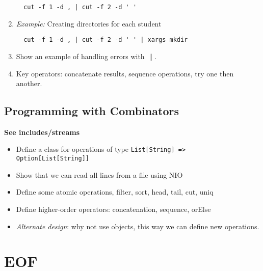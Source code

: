 \documentclass[9pt]{extbook}
\begin{document}
\begin{enumerate}
  \begin{lstlisting}
  cut -f 1 -d , | cut -f 2 -d ' '
  \end{lstlisting}

  
  \item \emph{Example:} Creating directories for each student

  \begin{lstlisting}
  cut -f 1 -d , | cut -f 2 -d ' ' | xargs mkdir
  \end{lstlisting}

  \item Show an example of handling errors with $\|$.

  \item Key operators: concatenate results, sequence operations, try one then
  another.

\end{enumerate}

\section{Programming with Combinators}

\textbf{See includes/streams}

\begin{itemize}

  \item Define a class for operations of type \lstinline|List[String] => Option[List[String]]|

  \item Show that we can read all lines from a file using NIO

  \item Define some atomic operations, filter, sort, head, tail, cut, uniq

  \item Define higher-order operators: concatenation, sequence, orElse

  \item \emph{Alternate design}: why not use objects, this way we can define
  new operations.

\end{itemize}

\chapter{EOF}
\end{document}
